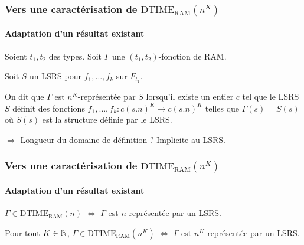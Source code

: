 \documentclass[10pt]{beamer}
\newcommand{\dtimeram}{\text{DTIME}_{\text{RAM}}\left( n^K \right)}
\begin{document}
	
	
	\begin{frame}
		\frametitle{Vers une caractérisation de $\dtimeram$}
		\framesubtitle{Adaptation d'un résultat existant}
		
		\begin{defn}
			\label{def:representee_par_LSRS}
			Soient $t_1, t_2$ des types. Soit $\Gamma$ une $(t_1, t_2)$-fonction de RAM.
			
			Soit $S$ un LSRS pour $f_1, \dots, f_k$ sur $F_{t_1}$. 
			
			On dit que $\Gamma$ est $n^K$-représentée par $S$ lorsqu'il existe un entier $c$ tel que le LSRS $S$ définit des fonctions $f_1, \dots, f_k : c (s.n)^K \to c (s.n)^K$ telles que $\Gamma(s) = S(s)$ où $S(s)$ est la structure définie par le LSRS.
		\end{defn}
		
		$\Rightarrow$ Longueur du domaine de définition ? \pause Implicite au LSRS.
	\end{frame}
	
	\begin{frame}
		\frametitle{Vers une caractérisation de $\dtimeram$}
		\framesubtitle{Adaptation d'un résultat existant}
		
		\begin{thm}
			$\Gamma \in \text{DTIME}_{\text{RAM}}\left( n \right)$ $\Leftrightarrow$ $\Gamma$ est $n$-représentée par un LSRS.
		\end{thm}
		
		\espace 
		
		\pause 
		
		\begin{thm}
			Pour tout $K \in \mathbb{N}$, $\Gamma \in \text{DTIME}_{\text{RAM}}\left( n^K \right)$ $\Leftrightarrow$ $\Gamma$ est $n^K$-représentée par un LSRS.
		\end{thm}
	\end{frame}
	
	
\end{document}
